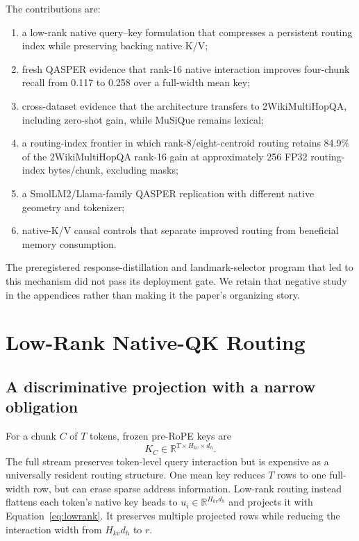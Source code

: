 \documentclass[11pt]{article}
\newcommand{\kv}{\textsc{K/V}\xspace}
\newcommand{\qasper}{QASPER\xspace}
\newcommand{\twowiki}{2WikiMultiHopQA\xspace}
\newcommand{\musique}{MuSiQue\xspace}
\begin{document}
The contributions are:
\begin{enumerate}[leftmargin=*,itemsep=2pt]
  \item a low-rank native query--key formulation that compresses a persistent
  routing index while preserving backing native \kv;
  \item fresh \qasper evidence that rank-16 native interaction improves
  four-chunk recall from 0.117 to 0.258 over a full-width mean key;
  \item cross-dataset evidence that the architecture transfers to \twowiki,
  including zero-shot gain, while \musique remains lexical;
  \item a routing-index frontier in which rank-8/eight-centroid routing retains
  84.9\% of the \twowiki rank-16 gain at approximately 256 FP32
  routing-index bytes/chunk, excluding masks;
  \item a SmolLM2/Llama-family \qasper replication with different native
  geometry and tokenizer;
  \item native-\kv causal controls that separate improved routing from
  beneficial memory consumption.
\end{enumerate}

The preregistered response-distillation and landmark-selector program that led
to this mechanism did not pass its deployment gate. We retain that negative
study in the appendices rather than making it the paper's organizing story.

\section{Low-Rank Native-QK Routing}
\subsection{A discriminative projection with a narrow obligation}
For a chunk $C$ of $T$ tokens, frozen pre-RoPE keys are
\begin{equation}
  K_C\in\mathbb{R}^{T\times H_{kv}\times d_h}.
\end{equation}
The full stream preserves token-level query interaction but is expensive as a
universally resident routing structure. One mean key reduces $T$ rows to one
full-width row, but can erase sparse address information. Low-rank routing
instead flattens each token's native key heads to $u_i\in\mathbb{R}^{H_{kv}d_h}$
and projects it with Equation~\ref{eq:lowrank}. It preserves multiple projected
rows while reducing the interaction width from $H_{kv}d_h$ to $r$.
\end{document}
